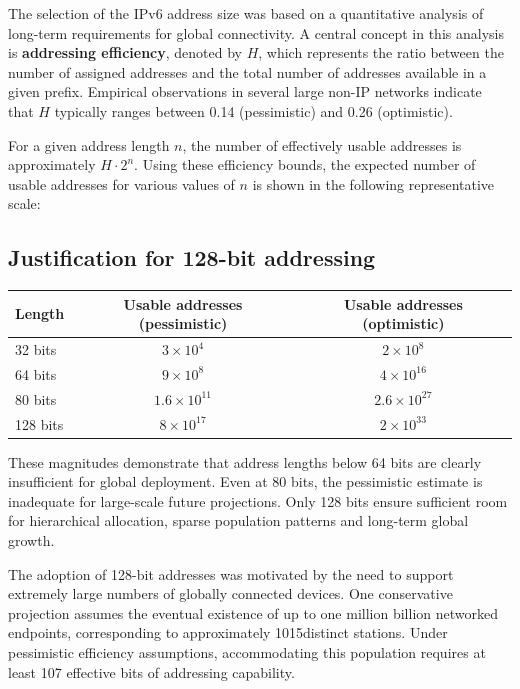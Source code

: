 \documentclass[11pt,a4paper,openany]{report}
\begin{document}
The selection of the IPv6 address size was based on a quantitative analysis of long-term requirements for global connectivity. A central concept in this analysis is \textbf{addressing efficiency}, denoted by $H$, which represents the ratio between the number of assigned addresses and the total number of addresses available in a given prefix. Empirical observations in several large non-IP networks indicate that $H$ typically ranges between 0.14 (pessimistic) and 0.26 (optimistic).

For a given address length $n$, the number of effectively usable addresses is approximately $H \cdot 2^n$. Using these efficiency bounds, the expected number of usable addresses for various values of $n$ is shown in the following representative scale:

\subsection{Justification for 128-bit addressing}

\begin{center}
\begin{tabular}{@{}lcc@{}}
\toprule
\textbf{Length} & \textbf{Usable addresses (pessimistic)} & \textbf{Usable addresses (optimistic)}\\
\midrule
32 bits & $3 \times 10^{4}$ & $2 \times 10^{8}$\\
64 bits & $9 \times 10^{8}$ & $4 \times 10^{16}$\\
80 bits & $1.6 \times 10^{11}$ & $2.6 \times 10^{27}$\\
128 bits & $8 \times 10^{17}$ & $2 \times 10^{33}$\\
\bottomrule
\end{tabular}
\end{center}

These magnitudes demonstrate that address lengths below 64 bits are clearly insufficient for global deployment. Even at 80 bits, the pessimistic estimate is inadequate for large-scale future projections. Only 128 bits ensure sufficient room for hierarchical allocation, sparse population patterns and long-term global growth.

The adoption of 128-bit addresses was motivated by the need to support extremely large numbers of globally connected devices. One conservative projection assumes the eventual existence of up to one million billion networked endpoints, corresponding to approximately 1015distinct stations. Under pessimistic efficiency assumptions, accommodating this population requires at least 107 effective bits of addressing capability.
\end{document}

